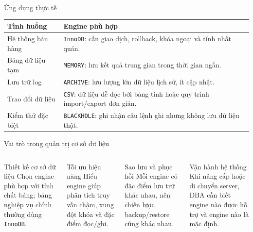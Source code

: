 \documentclass[aspectratio=169,11pt]{beamer}
\newcommand{\code}[1]{\texttt{#1}}
\begin{document}
\begin{frame}{Ứng dụng thực tế}
\begin{center}
\begin{tabularx}{0.96\textwidth}{p{} X}
\toprule
\textbf{Tình huống} & \textbf{Engine phù hợp} \\
\midrule
Hệ thống bán hàng & \code{InnoDB}: cần giao dịch, rollback, khóa ngoại và tính nhất quán. \\
Bảng dữ liệu tạm & \code{MEMORY}: lưu kết quả trung gian trong thời gian ngắn. \\
Lưu trữ log & \code{ARCHIVE}: lưu lượng lớn dữ liệu lịch sử, ít cập nhật. \\
Trao đổi dữ liệu & \code{CSV}: dữ liệu dễ đọc bởi bảng tính hoặc quy trình import/export đơn giản. \\
Kiểm thử đặc biệt & \code{BLACKHOLE}: ghi nhận câu lệnh ghi nhưng không lưu dữ liệu thật. \\
\bottomrule
\end{tabularx}
\end{center}
\end{frame}

\begin{frame}{Vai trò trong quản trị cơ sở dữ liệu}
\begin{columns}[T,onlytextwidth]
\begin{block}{Thiết kế cơ sở dữ liệu}
Chọn engine phù hợp với tính chất bảng; bảng nghiệp vụ chính thường dùng \code{InnoDB}.
\end{block}
\begin{block}{Tối ưu hiệu năng}
Hiểu engine giúp phân tích truy vấn chậm, xung đột khóa và đặc điểm đọc/ghi.
\end{block}
\begin{block}{Sao lưu và phục hồi}
Mỗi engine có đặc điểm lưu trữ khác nhau, nên chiến lược backup/restore cũng khác nhau.
\end{block}
\begin{block}{Vận hành hệ thống}
Khi nâng cấp hoặc di chuyển server, DBA cần biết engine nào được hỗ trợ và engine nào là mặc định.
\end{block}
\end{columns}
\end{frame}
\end{document}
